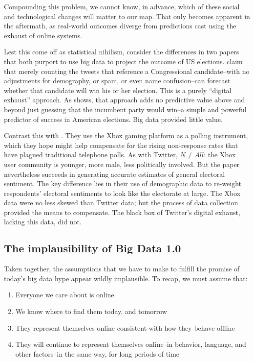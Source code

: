 \documentclass[12pt]{article}
\begin{document}
Compounding this problem, we cannot know, in advance, which of these
social and technological changes will matter to our map. That only
becomes apparent in the aftermath, as real-world outcomes diverge from
predictions cast using the exhaust of online systems.

Lest this come off as statistical nihilism, consider the differences
in two papers that both purport to use big data to project the outcome
of US elections. \cite{digrazia2013} claim that merely counting the
tweets that reference a Congressional candidate--with no adjustments
for demography, or spam, or even name confusion--can forecast whether that candidate will win his or her election. This is a
purely ``digital exhaust'' approach. As \cite{huberty2013twitter}
shows, that approach adds no predictive value
above and beyond just guessing that the incumbent party would win--a
simple and powerful predictor of success in American
elections. Big data provided little value.

Contrast this with \cite{gelman2013}. They use the Xbox gaming platform as a polling
instrument, which they hope might help compensate for the rising
non-response rates that have plagued traditional telephone polls. As
with Twitter, $N \neq All$: the Xbox user community is younger, more
male, less politically involved. But the paper nevertheless
succeeds in generating accurate estimates of general electoral
sentiment. The key difference lies in their use of demographic data to
re-weight respondents' electoral sentiments to look like the
electorate at large. The Xbox data were no less skewed than Twitter
data; but the process of data collection provided the means to
compensate. The black box of Twitter's digital exhaust, lacking this
data, did not.



\subsection{The implausibility of Big Data 1.0}
\label{sec:impl-big-data}


Taken together, the assumptions that we have to make to fulfill the
promise of today's big data hype appear wildly implausible. To recap,
we must assume that:

\begin{enumerate}
\item Everyone we care about is online
\item We know where to find
  them today, and tomorrow
\item They represent themselves online
  consistent with how they behave offline
\item They will continue
  to represent themselves online--in behavior, language, and other
  factors--in the same way, for long periods of time
\end{enumerate}
\end{document}
